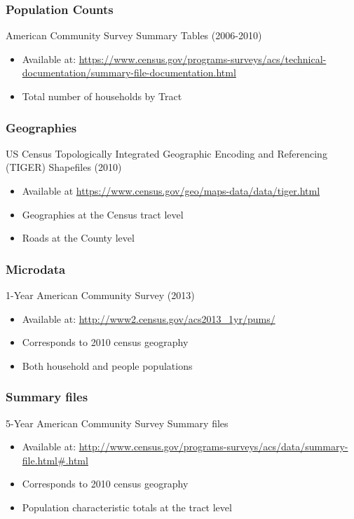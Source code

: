 \documentclass[font=9pt]{article}
\begin{document}
\subsubsection{Population Counts}
American Community Survey Summary Tables (2006-2010) \cite{2010sf}
\begin{itemize}
	\item Available at: \url{https://www.census.gov/programs-surveys/acs/technical-documentation/summary-file-documentation.html}
	\item Total number of households by Tract 
\end{itemize}

\subsubsection{Geographies}
US Census Topologically Integrated Geographic Encoding and Referencing (TIGER) Shapefiles (2010) \cite{ustiger2010}
\begin{itemize}
	\item Available at \url{https://www.census.gov/geo/maps-data/data/tiger.html}
	\item Geographies at the Census tract level
	\item Roads at the County level
\end{itemize}

\subsubsection{Microdata}
1-Year American Community Survey (2013) \cite{1yearuspums2013}
\begin{itemize}
	\item Available at: \url{http://www2.census.gov/acs2013_1yr/pums/}
	\item Corresponds to 2010 census geography 
	\item Both household and people populations
\end{itemize}

\subsubsection{Summary files}
5-Year American Community Survey Summary files \cite{2010sf}
\begin{itemize}
	\item Available at: \url{http://www.census.gov/programs-surveys/acs/data/summary-file.html#.html}
	\item Corresponds to 2010 census geography
	\item Population characteristic totals at the tract level 
\end{itemize}
\end{document}
